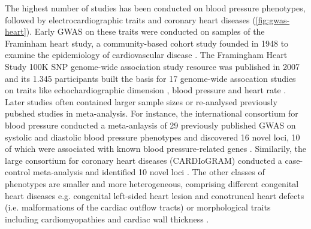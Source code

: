 The highest number of studies has been conducted on blood pressure phenotypes, followed by electrocardiographic traits and coronary heart diseases  (\cref{fig:gwas-heart}).  Early GWAS on these traits were conducted on samples of the Framinham heart study, a community-based cohort study founded in 1948 to examine the epidemiology of cardiovascular disease \citep{Dawber1951,Kannel1979}. The  Framingham Heart Study 100K SNP genome-wide association study resource was published in 2007 \citep{Cupples2007} and its  \num{1,345} participants built the basis for \num{17} genome-wide assocation studies on traits like echochardiographic dimension \citep{Vasan2007}, blood pressure \citep{Levy2007} and heart rate \citep{Newton-Cheh}. Later studies often contained larger sample sizes or re-analysed previously pubshed studies in meta-analysis. For instance, the international consortium for blood pressure conducted a meta-anlaysis of \num{29} previously published GWAS on systolic and diastolic blood pressure phenotypes and discovered \num{16} novel loci, \num{10} of which were associated with known blood pressure-related genes \citep{Ehret2011}. Similarily, the large consortium for coronary heart diseases  (CARDIoGRAM)  conducted a case-control meta-analysis  and identified \num{10} novel loci  \citep{Nikpay2015}. The other classes of phenotypes are smaller and more heterogeneous, comprising different congenital heart diseases e.g. congenital left-sided heart lesion \citep{Mitchell2014,Hanchard2016} and conotruncal heart defects (i.e. malformations of the cardiac outflow tracts) \citep{Agopian2014} or morphological traits including cardiomyopathies \citep{ Villard2011} and cardiac wall thickness \citep{Vasan2009,Arnett2011}. 







